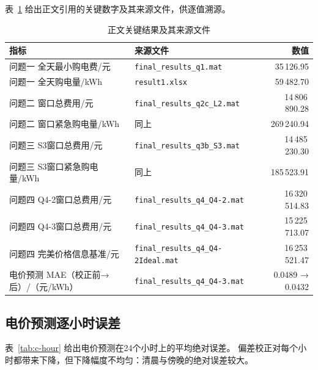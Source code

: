 表~\ref{tab:c-index} 给出正文引用的关键数字及其来源文件，供逐值溯源。

\begin{table}[H]
\centering
{}
\begin{tabular}{llr}
\toprule
指标 & 来源文件 & 数值 \\
\midrule
问题一 全天最小购电费/元 & \texttt{final\_results\_q1.mat} & 35\,126.95 \\
问题一 全天购电量/kWh & \texttt{result1.xlsx} & 59\,482.70 \\
问题二 窗口总费用/元 & \texttt{final\_results\_q2c\_L2.mat} & 14\,806\,890.28 \\
问题二 窗口紧急购电量/kWh & 同上 & 269\,240.94 \\
问题三 S3窗口总费用/元 & \texttt{final\_results\_q3b\_S3.mat} & 14\,485\,230.30 \\
问题三 S3窗口紧急购电量/kWh & 同上 & 185\,523.91 \\
问题四 Q4-2窗口总费用/元 & \texttt{final\_results\_q4\_Q4-2.mat} & 16\,320\,514.83 \\
问题四 Q4-3窗口总费用/元 & \texttt{final\_results\_q4\_Q4-3.mat} & 15\,225\,713.07 \\
问题四 完美价格信息基准/元 & \texttt{final\_results\_q4\_Q4-2Ideal.mat} & 16\,253\,521.47 \\
电价预测 MAE（校正前→后）/（元/kWh） & \texttt{final\_results\_q4\_Q4-3.mat} & 0.0489 → 0.0432 \\
\bottomrule
\end{tabular}
\caption{正文关键结果及其来源文件}
\label{tab:c-index}
\end{table}

\subsection{电价预测逐小时误差}

表~\ref{tab:c-hour} 给出电价预测在24个小时上的平均绝对误差。
偏差校正对每个小时都带来下降，但下降幅度不均匀：清晨与傍晚的绝对误差较大。


